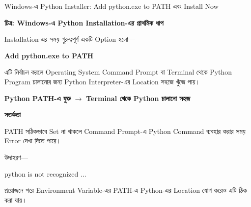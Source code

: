 {Windows-এ Python Installer: Add python.exe to PATH এবং Install Now}

\begin{center}
\footnotesize\textbf{চিত্র: Windows-এ Python Installation-এর প্রাথমিক ধাপ}
\end{center}



Installation-এর সময় গুরুত্বপূর্ণ একটি Option হলো—

\begin{center}

\textbf{Add python.exe to PATH}

\end{center}

এটি নির্বাচন করলে Operating System Command Prompt বা Terminal
থেকে Python Program চালানোর জন্য Python Interpreter-এর
Location সহজে খুঁজে পায়।

\begin{center}

\textbf{Python PATH-এ যুক্ত}
\(\longrightarrow\)
\textbf{Terminal থেকে Python চালানো সহজ}

\end{center}

\begin{rememberbox}

\textbf{\color{deepOrange}সতর্কতা}

PATH সঠিকভাবে Set না থাকলে Command Prompt-এ
Python Command ব্যবহার করার সময় Error দেখা দিতে পারে।

উদাহরণ—

\begin{codebox}

\begin{english}
\ttfamily
python is not recognized ...
\end{english}

\end{codebox}

প্রয়োজনে পরে Environment Variable-এর PATH-এ Python-এর
Location যোগ করেও এটি ঠিক করা যায়।

\end{rememberbox}


